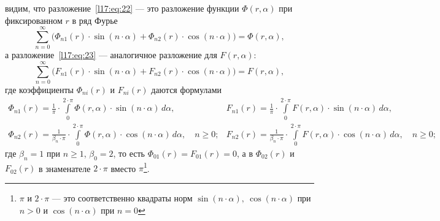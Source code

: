видим, что разложение~\eqref{l17:eq:22} --- это разложение функции $\Phi(r,\alpha)$ при фиксированном $r$ в ряд Фурье
\begin{equation*}
	\sum\limits_{n=0}^{\infty}\Big(\Phi_{n1}(r)\cdot\sin\left(n\cdot\alpha\right)+\Phi_{n2}(r)\cdot\cos\left(n\cdot\alpha\right)\Big)=\Phi(r,\alpha),
\end{equation*}
а разложение~\eqref{l17:eq:23} --- аналогичное разложение для $F(r,\alpha)$:
\begin{equation*}
	\sum\limits_{n=0}^{\infty}\Big(F_{n1}(r)\cdot\sin\left(n\cdot\alpha\right)+F_{n2}(r)\cdot\cos\left(n\cdot\alpha\right)\Big)=F(r,\alpha),
\end{equation*}
где коэффициенты $\Phi_{ni}(r)$ и $F_{ni}(r)$ даются формулами
\begin{subequations}
	\label{l17:eq:25}
\begin{multline}\label{l17:eq:25a}
	\Phi_{n1}(r)=\frac{1}{\pi}\cdot\int\limits_{0}^{2\cdot\pi}\Phi(r,\alpha)\cdot\sin\left(n\cdot\alpha\right)\,d\alpha,\\
	\Phi_{n2}(r)=\frac{1}{\beta_n\cdot\pi}\cdot\int\limits_{0}^{2\cdot\pi}\Phi(r,\alpha)\cdot\cos\left(n\cdot\alpha\right)\,d\alpha,\quad n\geqslant0;
\end{multline}
\begin{multline}\label{l17:eq:25b}
	F_{n1}(r)=\frac{1}{\pi}\cdot\int\limits_{0}^{2\cdot\pi}F(r,\alpha)\cdot\sin\left(n\cdot\alpha\right)\,d\alpha,\\ F_{n2}(r)=\frac{1}{\beta_n\cdot\pi}\cdot\int\limits_{0}^{2\cdot\pi}F(r,\alpha)\cdot\cos\left(n\cdot\alpha\right)\,d\alpha,\quad n\geqslant0;
\end{multline}
\end{subequations}
где $\beta_n=1$ при $n\geqslant1$, $\beta_0=2$, то есть $\Phi_{01}(r)=F_{01}(r)=0$, а в $\Phi_{02}(r)$ и $F_{02}(r)$ в знаменателе $2\cdot\pi$ вместо $\pi$\footnote{$\pi$ и $2\cdot\pi$ --- это соответственно квадраты норм $\sin(n\cdot\alpha),\ \cos(n\cdot\alpha)$ при $n>0$ и $\cos(n\cdot\alpha)$ при $n=0$}.

